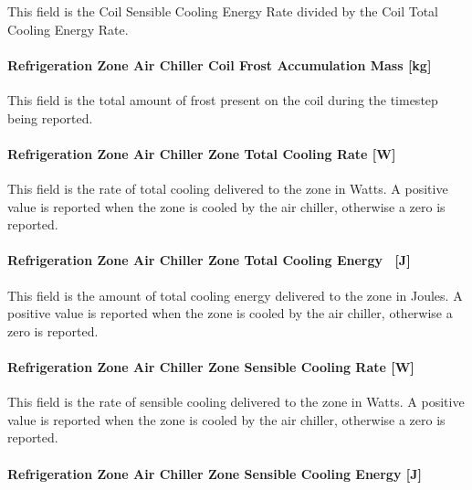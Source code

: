 This field is the Coil Sensible Cooling Energy Rate divided by the Coil Total Cooling Energy Rate.

\paragraph{Refrigeration Zone Air Chiller Coil Frost Accumulation Mass {[}kg{]}}\label{refrigeration-zone-air-chiller-coil-frost-accumulation-mass-kg}

This field is the total amount of frost present on the coil during the timestep being reported.

\paragraph{Refrigeration Zone Air Chiller Zone Total Cooling Rate {[}W{]}}\label{refrigeration-zone-air-chiller-zone-total-cooling-rate-w}

This field is the rate of total cooling delivered to the zone in Watts. A positive value is reported when the zone is cooled by the air chiller, otherwise a zero is reported.

\paragraph{Refrigeration Zone Air Chiller Zone Total Cooling Energy ~{[}J{]}}\label{refrigeration-zone-air-chiller-zone-total-cooling-energy-j}

This field is the amount of total cooling energy delivered to the zone in Joules. A positive value is reported when the zone is cooled by the air chiller, otherwise a zero is reported.

\paragraph{Refrigeration Zone Air Chiller Zone Sensible Cooling Rate {[}W{]}}\label{refrigeration-zone-air-chiller-zone-sensible-cooling-rate-w}

This field is the rate of sensible cooling delivered to the zone in Watts. A positive value is reported when the zone is cooled by the air chiller, otherwise a zero is reported.

\paragraph{Refrigeration Zone Air Chiller Zone Sensible Cooling Energy {[}J{]}}\label{refrigeration-zone-air-chiller-zone-sensible-cooling-energy-j}

